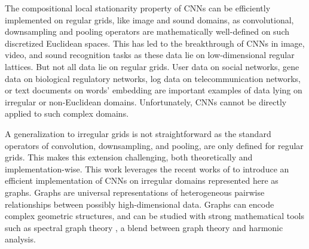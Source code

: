 \documentclass{article}
\newcommand{\bO}{\mathcal{O}}
\begin{document}
The compositional local stationarity property of CNNs can be efficiently
implemented on regular grids, like image and sound domains, as convolutional, 
downsampling and pooling operators are mathematically well-defined on such discretized
Euclidean spaces. This has led to the breakthrough of CNNs in image, video, and
sound recognition tasks \cite{art:LeCunBengioHinton15DL} as these data lie on
low-dimensional regular lattices. But not all data lie on regular grids. User
data on social networks, gene data on biological regulatory networks, log data
on telecommunication networks, or text documents on words' embedding are
important examples of data lying on irregular or non-Euclidean domains.
Unfortunately, CNNs cannot be directly applied to such complex domains.%


A generalization to irregular grids is not straightforward as the standard operators of convolution, downsampling, and pooling, are only defined for regular grids. This makes this extension challenging, both theoretically and implementation-wise. This work leverages the recent works of
\cite{pro:GregorLeCun10LRF, pro:CoatesNg11LRF,
art:BrunaZarembaSzlamLeCun13DLgraphs, art:HenaffBrunaLeCun15DLgraphs,
art:HammondVandergheynstGribonval11GraphWav,
art:ShumanNarangFrossardOrtegaVandergheynst13ReviewSPG} to introduce an
efficient implementation of CNNs on irregular domains represented here as
graphs. Graphs are universal representations of heterogeneous pairwise
relationships between possibly high-dimensional data. Graphs can encode complex
geometric structures, and can be studied with strong mathematical tools such as
spectral graph theory \cite{book:Chung97Spectral}, a blend between graph theory and harmonic analysis.

\end{document}
